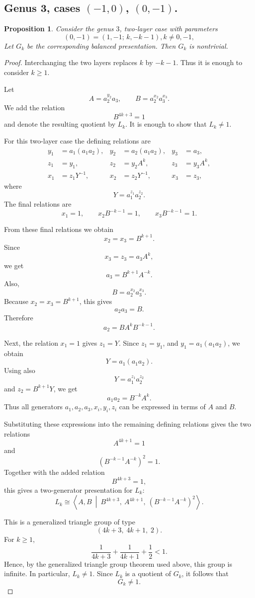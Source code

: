 \documentclass{article}
\newtheorem{prop}[theorem]{Proposition}
\begin{document}
\subsection{ Genus 3,  cases $(-1,0)$, $(0,-1)$.}  \label{se:-1,0}
\begin{prop}
Consider the genus \(3\), two-layer case with parameters
\[
(0,-1)=(1,-1;\,k,-k-1), k\neq 0,-1,
\]
Let \(G_k\) be the corresponding balanced presentation. Then \(G_k\) is
nontrivial.
\end{prop}

\begin{proof}
Interchanging the two layers replaces $k$ by $-k-1$.  Thus it is enough to
consider $k\geq1$.

Let
\[
A=a_2^{y_2}a_3,
\qquad
B=a_2^{x_2}a_3^{x_3}.
\]
We add the relation
\[
B^{4k+3}=1
\]
and denote the resulting quotient by \(L_k\). It is enough to show that
\(L_k\neq 1\).

For this two-layer case the defining relations are
\[
\begin{aligned}
y_1&=a_1(a_1a_2),& y_2&=a_2(a_1a_2),& y_3&=a_3,\\
z_1&=y_1,& z_2&=y_2A^k,& z_3&=y_3A^k,\\
x_1&=z_1Y^{-1},& x_2&=z_2Y^{-1},& x_3&=z_3,
\end{aligned}
\]
where
\[
Y=a_1^{z_1}a_2^{z_2}.
\]
The final relations are
\[
x_1=1,\qquad
x_2B^{-k-1}=1,\qquad
x_3B^{-k-1}=1.
\]

From these final relations we obtain
\[
x_2=x_3=B^{k+1}.
\]
Since
\[
x_3=z_3=a_3A^k,
\]
we get
\[
a_3=B^{k+1}A^{-k}.
\]
Also,
\[
B=a_2^{x_2}a_3^{x_3}.
\]
Because \(x_2=x_3=B^{k+1}\), this gives
\[
a_2a_3=B.
\]
Therefore
\[
a_2=BA^kB^{-k-1}.
\]

Next, the relation \(x_1=1\) gives \(z_1=Y\). Since \(z_1=y_1\), and
\(y_1=a_1(a_1a_2)\), we obtain
\[
Y=a_1(a_1a_2).
\]
Using also
\[
Y=a_1^{z_1}a_2^{z_2}
\]
and \(z_2=B^{k+1}Y\), we get
\[
a_1a_2=B^{-k}A^k.
\]
Thus all generators \(a_1,a_2,a_3,x_i,y_i,z_i\) can be expressed in terms
of \(A\) and \(B\).

Substituting these expressions into the remaining defining relations gives
the two relations
\[
A^{4k+1}=1
\]
and
\[
(B^{-k-1}A^{-k})^2=1.
\]
Together with the added relation
\[
B^{4k+3}=1,
\]
this gives a two-generator presentation for \(L_k\):
\[
L_k\cong
\left\langle A,B \ \middle|\
B^{4k+3},\ A^{4k+1},\
(B^{-k-1}A^{-k})^2
\right\rangle .
\]


This is a generalized triangle group of type
\[
(4k+3,\;4k+1,\;2).
\]
For \(k\geq 1\),
\[
\frac{1}{4k+3}+\frac{1}{4k+1}+\frac12<1.
\]
Hence, by the generalized triangle group theorem used above, this group is
infinite. In particular, \(L_k\neq 1\). Since \(L_k\) is a quotient of
\(G_k\), it follows that
\[
G_k\neq 1.
\]
\end{proof}
\end{document}
